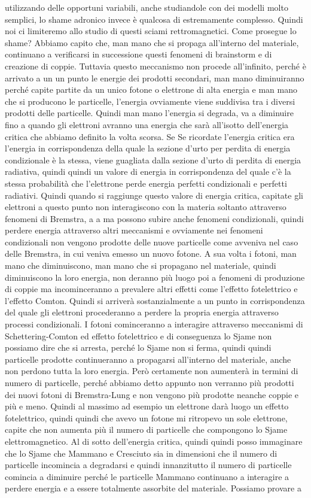 {utilizzando delle opportuni variabili, anche studiandole con dei modelli molto semplici, lo shame adronico invece è qualcosa di estremamente complesso. Quindi noi ci limiteremo allo studio di questi sciami rettromagnetici. Come prosegue lo shame? Abbiamo capito che, man mano che si propaga all'interno del materiale, continuano a verificarsi in successione questi fenomeni di brainstorm e di creazione di coppie. Tuttavia questo meccanismo non procede all'infinito, perché è arrivato a un un punto le energie dei prodotti secondari, man mano diminuiranno perché capite partite da un unico fotone o elettrone di alta energia e man mano che si producono le particelle, l'energia ovviamente viene suddivisa tra i diversi prodotti delle particelle. Quindi man mano l'energia si degrada, va a diminuire fino a quando gli elettroni avranno una energia che sarà all'isotto dell'energia critica che abbiamo definito la volta scorsa. Se Se ricordate l'energia critica era l'energia in corrispondenza della quale la sezione d'urto per perdita di energia condizionale è la stessa, viene guagliata dalla sezione d'urto di perdita di energia radiativa, quindi quindi un valore di energia in corrispondenza del quale c'è la stessa probabilità che l'elettrone perde energia perfetti condizionali e perfetti radiativi. Quindi quando si raggiunge questo valore di energia critica, capitate gli elettroni a questo punto non interagiscono con la materia soltanto attraverso fenomeni di Bremstra, a a ma possono subire anche fenomeni condizionali, quindi perdere energia attraverso altri meccanismi e ovviamente nei fenomeni condizionali non vengono prodotte delle nuove particelle come avveniva nel caso delle Bremstra, in cui veniva emesso un nuovo fotone. A sua volta i fotoni, man mano che diminuiscono, man mano che si propagano nel materiale, quindi diminuiscono la loro energia, non deranno più luogo poi a fenomeni di produzione di coppie ma incominceranno a prevalere altri effetti come l'effetto fotelettrico e l'effetto Comton. Quindi si arriverà sostanzialmente a un punto in corrispondenza del quale gli elettroni procederanno a perdere la propria energia attraverso processi condizionali. I fotoni cominceranno a interagire attraverso meccanismi di Schettering-Comton ed effetto fotelettrico e di conseguenza lo Sjame non possiamo dire che si arresta, perché lo Sjame non si ferma, quindi quindi particelle prodotte continueranno a propagarsi all'interno del materiale, anche non perdono tutta la loro energia. Però certamente non aumenterà in termini di numero di particelle, perché abbiamo detto appunto non verranno più prodotti dei nuovi fotoni di Bremstra-Lung e non vengono più prodotte neanche coppie e più e meno. Quindi al massimo ad esempio un elettrone darà luogo un effetto fotelettrico, quindi quindi che avevo un fotone mi ritropevo un sole elettrone, capite che non aumenta più il numero di particelle che compongono lo Sjame elettromagnetico. Al di sotto dell'energia critica, quindi quindi posso immaginare che lo Sjame che Mammano e Cresciuto sia in dimensioni che il numero di particelle incomincia a degradarsi e quindi innanzitutto il numero di particelle comincia a diminuire perché le particelle Mammano continuano a interagire a perdere energia e a essere totalmente assorbite del materiale. Possiamo provare a }
